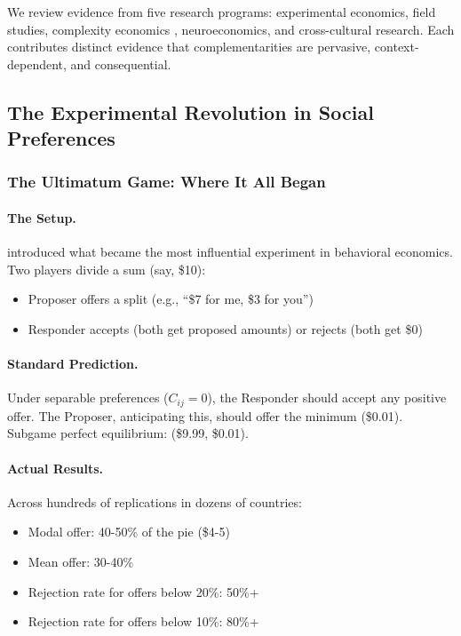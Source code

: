 \documentclass[12pt,a4paper]{article}
\begin{document}
We review evidence from five research programs: experimental economics,
field studies, complexity economics \citep{arrowetal1997}, neuroeconomics, and cross-cultural research.
Each contributes distinct evidence that complementarities are pervasive,
context-dependent, and consequential.

\subsection{The Experimental Revolution in Social Preferences}

\subsubsection{The Ultimatum Game: Where It All Began}

\paragraph{The Setup.}
\citet{guth1982} introduced what became the most influential experiment in
behavioral economics. Two players divide a sum (say, \$10):
\begin{itemize}
  \item Proposer offers a split (e.g., ``\$7 for me, \$3 for you'')
  \item Responder accepts (both get proposed amounts) or rejects (both get \$0)
\end{itemize}

\paragraph{Standard Prediction.}
Under separable preferences ($C_{ij} = 0$), the Responder should accept any positive offer.
The Proposer, anticipating this, should offer the minimum (\$0.01).
Subgame perfect equilibrium: (\$9.99, \$0.01).

\paragraph{Actual Results.}
Across hundreds of replications in dozens of countries:
\begin{itemize}
  \item Modal offer: 40-50\% of the pie (\$4-5)
  \item Mean offer: 30-40\%
  \item Rejection rate for offers below 20\%: 50\%+
  \item Rejection rate for offers below 10\%: 80\%+
\end{itemize}
\end{document}
